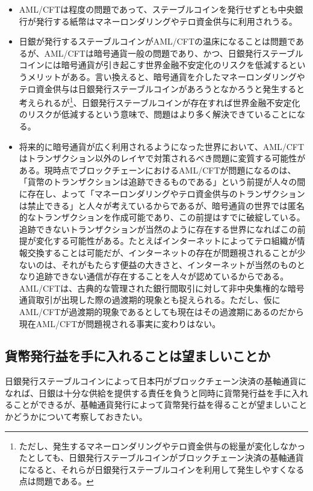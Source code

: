 \documentclass[dvipdfmx,a4paper]{jsarticle}
\begin{document}
\begin{itemize}
\item AML/CFTは程度の問題であって、ステーブルコインを発行せずとも中央銀行が発行する紙幣はマネーロンダリングやテロ資金供与に利用されうる。
\item 日銀が発行するステーブルコインがAML/CFTの温床になることは問題であるが、AML/CFTは暗号通貨一般の問題であり、かつ、日銀発行ステーブルコインには暗号通貨が引き起こす世界金融不安定化のリスクを低減するというメリットがある。言い換えると、暗号通貨を介したマネーロンダリングやテロ資金供与は日銀発行ステーブルコインがあろうとなかろうと発生すると考えられるが\footnote{ただし、発生するマネーロンダリングやテロ資金供与の総量が変化しなかったとしても、日銀発行ステーブルコインがブロックチェーン決済の基軸通貨になると、それらが日銀発行ステーブルコインを利用して発生しやすくなる点は問題である。}、日銀発行ステーブルコインが存在すれば世界金融不安定化のリスクが低減するという意味で、問題はより多く解決できていることになる。
\item 将来的に暗号通貨が広く利用されるようになった世界において、AML/CFTはトランザクション以外のレイヤで対策されるべき問題に変質する可能性がある。現時点でブロックチェーンにおけるAML/CFTが問題になるのは、「貨幣のトランザクションは追跡できるものである」という前提が人々の間に存在し、よって「マネーロンダリングやテロ資金供与のトランザクションは禁止できる」と人々が考えているからであるが、暗号通貨の世界では匿名的なトランザクションを作成可能であり、この前提はすでに破綻している。追跡できないトランザクションが当然のように存在する世界になればこの前提が変化する可能性がある。たとえばインターネットによってテロ組織が情報交換することは可能だが、インターネットの存在が問題視されることが少ないのは、それがもたらす便益の大きさと、インターネットが当然のものとなり追跡できない通信が存在することを人々が認めているからである。AML/CFTは、古典的な管理された銀行間取引に対して非中央集権的な暗号通貨取引が出現した際の過渡期的現象とも捉えられる。ただし、仮にAML/CFTが過渡期的現象であるとしても現在はその過渡期にあるのだから現在AML/CFTが問題視される事実に変わりはない。
\end{itemize}

\subsection{貨幣発行益を手に入れることは望ましいことか}

日銀発行ステーブルコインによって日本円がブロックチェーン決済の基軸通貨になれば、日銀は十分な供給を提供する責任を負うと同時に貨幣発行益を手に入れることができるが、基軸通貨発行によって貨幣発行益を得ることが望ましいことかどうかについて考察しておきたい。
\end{document}

